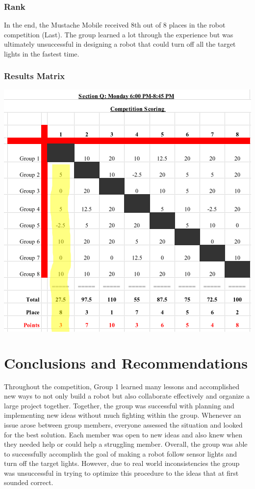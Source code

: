 \documentclass{article}
\begin{document}
\subsubsection{Rank}
In the end, the Mustache Mobile received 8th out of 8 places in the robot competition (Last). The group learned a lot through the experience but was ultimately unsuccessful in designing a robot that could turn off all the target lights in the fastest time. 

\subsubsection{Results Matrix}
\begin{center}
\includegraphics[width=\textwidth]{ScoringMatrix.png}
\end{center}

\section{Conclusions and Recommendations}
Throughout the competition, Group 1 learned many lessons and accomplished new ways to not only build a robot but also collaborate effectively and organize a large project together. Together, the group was successful with planning and implementing new ideas without much fighting within the group. Whenever an issue arose between group members, everyone assessed the situation and looked for the best solution. Each member was open to new ideas and also knew when they needed help or could help a struggling member. Overall, the group was able to successfully accomplish the goal of making a robot follow sensor lights and turn off the target lights. However, due to real world inconsistencies the group was unsuccessful in trying to optimize this procedure to the ideas that at first sounded correct.
\end{document}
